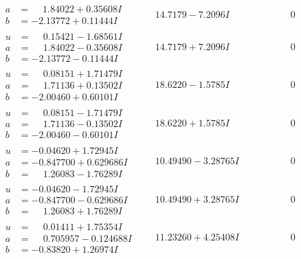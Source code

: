 \documentclass[1p]{elsarticle_modified}
\theoremstyle{definition}
\begin{document}
$$\begin{array}{c|c|c}
\begin{aligned}
a &= \phantom{-}1.84022 + 0.35608 I \\
b &= -2.13772 + 0.11444 I\end{aligned}
 & \phantom{-}14.7179 - 7.2096 I & \phantom{-0.000000 } 0 \\ \hline\begin{aligned}
u &= \phantom{-}0.15421 - 1.68561 I \\
a &= \phantom{-}1.84022 - 0.35608 I \\
b &= -2.13772 - 0.11444 I\end{aligned}
 & \phantom{-}14.7179 + 7.2096 I & \phantom{-0.000000 } 0 \\ \hline\begin{aligned}
u &= \phantom{-}0.08151 + 1.71479 I \\
a &= \phantom{-}1.71136 + 0.13502 I \\
b &= -2.00460 + 0.60101 I\end{aligned}
 & \phantom{-}18.6220 - 1.5785 I & \phantom{-0.000000 } 0 \\ \hline\begin{aligned}
u &= \phantom{-}0.08151 - 1.71479 I \\
a &= \phantom{-}1.71136 - 0.13502 I \\
b &= -2.00460 - 0.60101 I\end{aligned}
 & \phantom{-}18.6220 + 1.5785 I & \phantom{-0.000000 } 0 \\ \hline\begin{aligned}
u &= -0.04620 + 1.72945 I \\
a &= -0.847700 + 0.629686 I \\
b &= \phantom{-}1.26083 - 1.76289 I\end{aligned}
 & \phantom{-}10.49490 - 3.28765 I & \phantom{-0.000000 } 0 \\ \hline\begin{aligned}
u &= -0.04620 - 1.72945 I \\
a &= -0.847700 - 0.629686 I \\
b &= \phantom{-}1.26083 + 1.76289 I\end{aligned}
 & \phantom{-}10.49490 + 3.28765 I & \phantom{-0.000000 } 0 \\ \hline\begin{aligned}
u &= \phantom{-}0.01411 + 1.75354 I \\
a &= \phantom{-}0.705957 - 0.124688 I \\
b &= -0.83820 + 1.26974 I\end{aligned}
 & \phantom{-}11.23260 + 4.25408 I & \phantom{-0.000000 } 0\\

\end{array}$$
\end{document}
